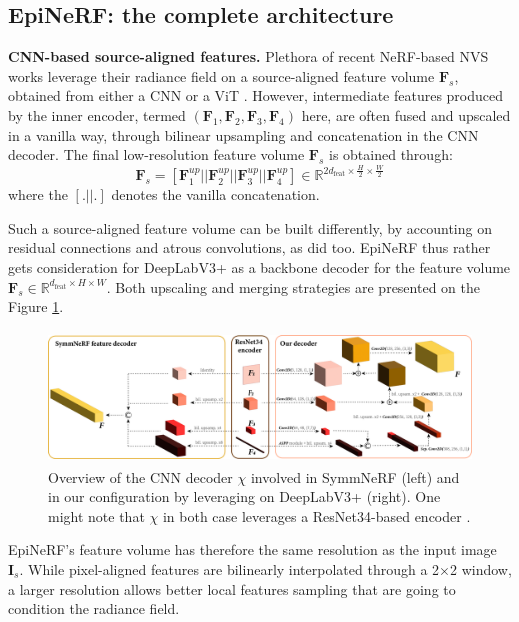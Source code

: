 \subsection{EpiNeRF: the complete architecture}
\label{subsec:epinerf}
\noindent\textbf{CNN-based source-aligned features.} Plethora of recent NeRF-based NVS works leverage their radiance field on a source-aligned feature volume $\mathbf{F}_{s}$, obtained from either a CNN \citep{jang2021codenerf,yu2021pixelnerf,li2022symmnerf} or a ViT \citep{lin2023vision}. However, intermediate features produced by the inner encoder, termed $(\mathbf{F}_{1},\mathbf{F}_{2},\mathbf{F}_{3},\mathbf{F}_{4})$ here,  are often fused and upscaled in a vanilla way, through bilinear upsampling and concatenation in the CNN decoder. The final low-resolution feature volume $\mathbf{F}_{s}$ is obtained through: 
\begin{equation}
    \mathbf{F}_{s} = \left[\mathbf{F}_{1}^{up} || \mathbf{F}_{2}^{up} || \mathbf{F}_{3}^{up} || \mathbf{F}_{4}^{up}\right] \in \mathbb{R}^{2d_{\text{feat}} \times \frac{H}{2} \times \frac{W}{2}}
\end{equation}
where the $[.||.]$ denotes the vanilla concatenation. 

Such a source-aligned feature volume can be built differently, by accounting on residual connections and atrous convolutions, as \citep{chan2023genvs} did too. 
EpiNeRF thus rather gets consideration for DeepLabV3+ \citep{chen2018encoder} as a backbone decoder for the feature volume $\textbf{F}_{s}\in \mathbb{R}^{d_{\text{feat}} \times H \times W}$.  Both upscaling and merging strategies are presented on the Figure \ref{fig:feature_encoder}. 

\begin{figure}[htb!]
    \center
  \includegraphics[height=3.5cm]{images/epinerf/feature_fusion_encoder.png}
  \caption{Overview of the CNN decoder $\chi$ involved in SymmNeRF (left) and in our configuration by leveraging on DeepLabV3+ (right). One might note that $\chi$ in both case leverages a ResNet34-based encoder \citep{he2016deep}. }
  \label{fig:feature_encoder}
\end{figure}
EpiNeRF's feature volume has therefore the same resolution as the input image $\mathbf{I}_s$. While pixel-aligned features are bilinearly interpolated through a 2$\times$2 window, a larger resolution allows better local features sampling that are going to condition the radiance field. \newline

